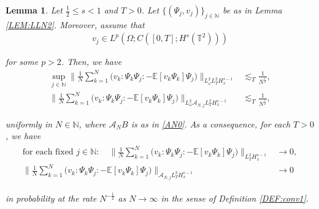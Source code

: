 \documentclass[letterpaper, 11pt,  reqno]{amsart}
\newtheorem{lemma}[theorem]{Lemma}
\newcommand{\1}{\hspace{0.5mm}\text{I}\hspace{0.2mm}}
\newcommand{\noi}{\noindent}
\newcommand{\T}{\mathbb{T}}
\newcommand{\N}{\mathbb{N}}
\newcommand{\E}{\mathbb{E}}
\newcommand{\les}{\lesssim}
\newcommand{\A}{\mathcal{A}}
\newcommand{\wick}[1]{:\!{#1}\!:}
\newcommand{\too}{\longrightarrow}
\renewcommand{\o}{\omega}
\numberwithin{equation}{section}
\numberwithin{theorem}{section}
\begin{document}
\begin{lemma}\label{LEM:LLN4}
Let $\frac 12  \le s < 1$ and $T > 0$.
Let $\{(\Psi_j, v_j)\}_{j \in \N}$ be as in Lemma \ref{LEM:LLN2}.
Moreover, assume that 
\begin{align}
v_j \in L^p (\Omega; C([0, T]; H^{s} (\T^2)))
\label{PN3a}
\end{align}


\noi
for some $p > 2$.
Then, 
we have
\begin{align}
\sup_{j \in \N} \bigg\| \frac 1N \sum_{k = 1}^N \Big( v_k\! \wick{\Psi_k \Psi_j} 
- \E [ v_k\Psi_k ] \Psi_j \Big) \bigg\|_{L^2_\o L_T^2 H_x^{s-1}} 
& \les_T \frac 1{N^\frac 12}, 
\label{PN2} \\
\bigg\| \frac 1N \sum_{k = 1}^N \Big( v_k \!\wick{\Psi_k \Psi_j} - \E [v_k\Psi_k ] \Psi_j \Big) 
\bigg\|_{L^2_\o\A_{N, j}L_T^2 H_x^{s-1}} 
& \les_T \frac 1{N^\frac 12}, 
\label{PN3}
\end{align}



\noi
uniformly in  $N \in \N$, 
where $\A_N B$ is as in \eqref{AN0}.
As a consequence,
for each $T > 0$, we have 
\begin{align}
\begin{split}
\text{for each fixed $j \in \N:$}
\quad 
\bigg\| \frac 1N \sum_{k = 1}^N \Big( v_k\! \wick{\Psi_k \Psi_j} 
- \E [ v_k\Psi_k ] \Psi_j \Big) \bigg\|_{ L_T^2 H_x^{s-1}} 
& \too 0 , \\
\bigg\| \frac 1N \sum_{k = 1}^N \Big( v_k \!\wick{\Psi_k \Psi_j} - \E [v_k\Psi_k ] \Psi_j \Big) 
\bigg\|_{\A_{N, j}L_T^2 H_x^{s-1}} 
& \too 0 
\end{split}
\label{PN4}
\end{align}

\noi
in probability
at the rate $N^{-\frac 12 }$
as $N \to \infty$
in the sense of Definition \ref{DEF:conv1}.



\end{lemma}
\end{document}
